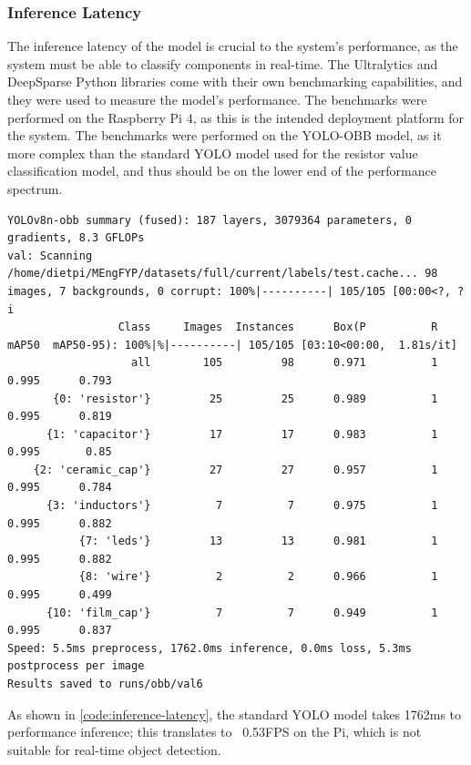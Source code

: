 \subsubsection{Inference Latency}
\label{sec:inference-latency-evaluation}
The inference latency of the model is crucial to the system's performance, as the system must be able to classify components in real-time. The Ultralytics and DeepSparse Python libraries come with their own benchmarking capabilities, and they were used to measure the model's performance. The benchmarks were performed on the Raspberry Pi 4, as this is the intended deployment platform for the system. The benchmarks were performed on the YOLO-OBB model, as it more complex than the standard YOLO model used for the resistor value classification model, and thus should be on the lower end of the performance spectrum.

\begin{minipage}[H]{\textwidth}
  \centering
  \begin{verbatim}
YOLOv8n-obb summary (fused): 187 layers, 3079364 parameters, 0 gradients, 8.3 GFLOPs
val: Scanning /home/dietpi/MEngFYP/datasets/full/current/labels/test.cache... 98 images, 7 backgrounds, 0 corrupt: 100%|----------| 105/105 [00:00<?, ?i
                 Class     Images  Instances      Box(P          R      mAP50  mAP50-95): 100%|%|----------| 105/105 [03:10<00:00,  1.81s/it]
                   all        105         98      0.971          1      0.995      0.793
       {0: 'resistor'}         25         25      0.989          1      0.995      0.819
      {1: 'capacitor'}         17         17      0.983          1      0.995       0.85
    {2: 'ceramic_cap'}         27         27      0.957          1      0.995      0.784
      {3: 'inductors'}          7          7      0.975          1      0.995      0.882
           {7: 'leds'}         13         13      0.981          1      0.995      0.882
           {8: 'wire'}          2          2      0.966          1      0.995      0.499
      {10: 'film_cap'}          7          7      0.949          1      0.995      0.837
Speed: 5.5ms preprocess, 1762.0ms inference, 0.0ms loss, 5.3ms postprocess per image
Results saved to runs/obb/val6
  \end{verbatim}
  \label{code:inference-latency}
\end{minipage}

As shown in \autoref{code:inference-latency}, the standard YOLO model takes 1762ms to performance inference; this translates to ~0.53FPS on the Pi, which is not suitable for real-time object detection. 

